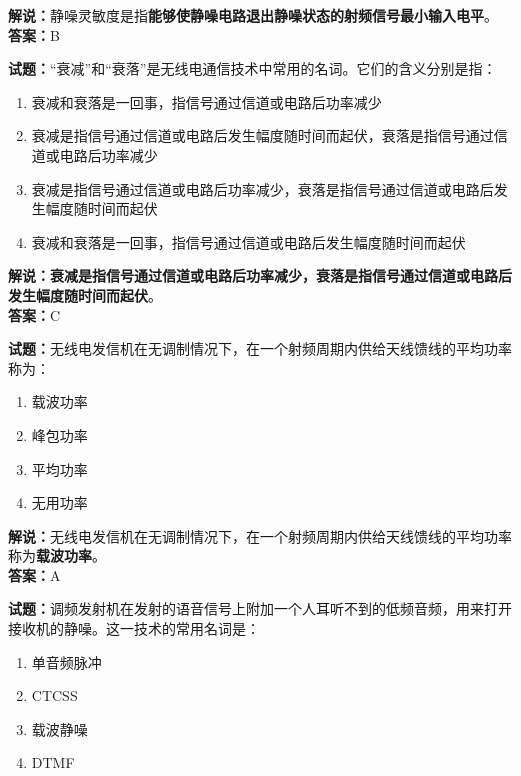 \documentclass{ctexbook}
\begin{document}
\noindent\textbf{解说：}静噪灵敏度是指\textbf{能够使静噪电路退出静噪状态的射频信号最小输入电平}。\\\noindent\textbf{答案：}B%

\vspace{\baselineskip}

\noindent\textbf{试题：}“衰减”和“衰落”是无线电通信技术中常用的名词。它们的含义分别是指：

\begin{enumerate}[leftmargin=3em]
  \item 衰减和衰落是一回事，指信号通过信道或电路后功率减少
  \item 衰减是指信号通过信道或电路后发生幅度随时间而起伏，衰落是指信号通过信道或电路后功率减少
  \item 衰减是指信号通过信道或电路后功率减少，衰落是指信号通过信道或电路后发生幅度随时间而起伏
  \item 衰减和衰落是一回事，指信号通过信道或电路后发生幅度随时间而起伏
\end{enumerate}

\noindent\textbf{解说：}\textbf{衰减是指信号通过信道或电路后功率减少，衰落是指信号通过信道或电路后发生幅度随时间而起伏}。\\\noindent\textbf{答案：}C%

\vspace{\baselineskip}

\noindent\textbf{试题：}无线电发信机在无调制情况下，在一个射频周期内供给天线馈线的平均功率称为：

\begin{enumerate}[leftmargin=3em]
  \item 载波功率
  \item 峰包功率
  \item 平均功率
  \item 无用功率
\end{enumerate}

\noindent\textbf{解说：}无线电发信机在无调制情况下，在一个射频周期内供给天线馈线的平均功率称为\textbf{载波功率}。\\\noindent\textbf{答案：}A%

\vspace{\baselineskip}

\noindent\textbf{试题：}调频发射机在发射的语音信号上附加一个人耳听不到的低频音频，用来打开接收机的静噪。这一技术的常用名词是：

\begin{enumerate}[leftmargin=3em]
  \item 单音频脉冲
  \item CTCSS
  \item 载波静噪
  \item DTMF
\end{enumerate}
\end{document}
